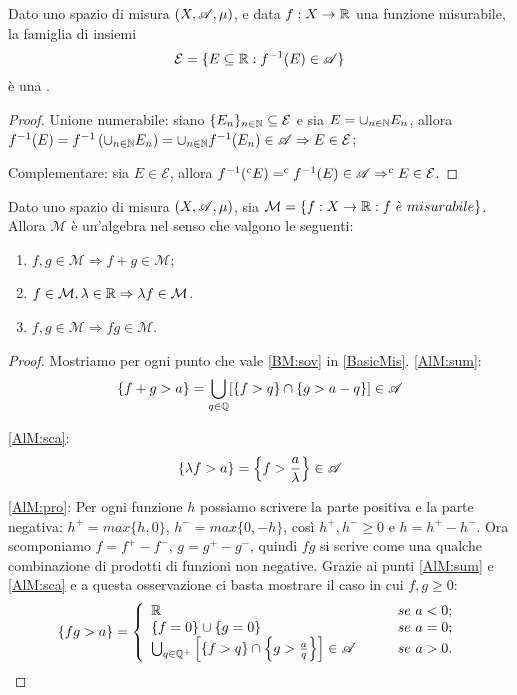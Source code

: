 \begin{proposition}
	\label{CounterImgMis}
	Dato uno spazio di misura $(X,\mathscr A,\mu)$, e data $f:X\rightarrow \mathbb R$ una funzione misurabile, la famiglia di insiemi
	\[
		\mathcal{E} = \{ E\subseteq \mathbb R : f^{-1}(E)\in \mathscr A \}
	\]
	è una \sigalg{}.
\end{proposition}
\begin{proof}
	Unione numerabile: siano $\{E_n\}_{n\in \mathbb N}\subseteq \mathcal{E}$ e sia $E = \cup_{n\in \mathbb N}E_n$,
	allora $f^{-1}(E)=f^{-1}\left(\cup_{n\in \mathbb N}E_n\right) = \cup_{n\in \mathbb N}f^{-1}(E_n)\in \mathscr A \Rightarrow E \in \mathcal{E}$;
	
	Complementare: sia $E\in \mathcal{E}$, allora $f^{-1}(^{c}E)= ^{c}f^{-1}(E)\in \mathscr A \Rightarrow ^{c}E \in \mathcal{E}$.
\end{proof}

\begin{proposition}
	Dato uno spazio di misura $(X,\mathscr A,\mu)$, sia $\mathcal{M}=\{f:X\rightarrow \R : f\ \grave{e} \ misurabile\}$.
	Allora $\mathcal{M}$ è un'algebra nel senso che valgono le seguenti:
	\begin{enumerate}[label=(\arabic*),ref=(\arabic*)]
		\item $f,g\in \mathcal{M} \Rightarrow f+g\in \mathcal{M}$; \label{AlM:sum}
		\item $f\in \mathcal{M}, \lambda \in \mathbb R \Rightarrow \lambda f\in \mathcal{M}$. \label{AlM:sca}
		\item $f,g\in \mathcal{M} \Rightarrow fg\in \mathcal{M}$. \label{AlM:pro}
	\end{enumerate}
\end{proposition}
\begin{proof}
	Mostriamo per ogni punto che vale \ref{BM:sov} in \cref{BasicMis}.
	\ref{AlM:sum}: 
	\[
		\{f+g>a\}=\bigcup_{q\in \mathbb Q}[\{f>q\}\cap\{g>a-q\}]\in \mathscr A
	\]

	
	\ref{AlM:sca}:
	\[
		\{\lambda f>a\}=\left\{f>\frac{a}{\lambda}\right\}\in \mathscr A
	\]

	\ref{AlM:pro}: Per ogni funzione $h$ possiamo scrivere la parte positiva e la parte negativa: $h^+ = max\{h,0\}$, $h^- = max\{0,-h\}$,
	così $h^+,h^- \geq 0$ e $h = h^+ - h^-$. Ora scomponiamo $f=f^+ - f^-$, $g=g^+- g^-$, quindi $fg$ si scrive
	come una qualche combinazione di prodotti di funzioni non negative. Grazie ai punti \ref{AlM:sum} e \ref{AlM:sca} e a questa osservazione
	ci basta mostrare il caso in cui $f,g\geq0$:
	\[
		\{fg>a\}=\left\{\begin{array}{ll}
			\mathbb R &\qquad se\ a<0;\\
			\{f=0\}\cup\{g=0\} &\qquad se\ a=0;\\
			\bigcup_{q\in \mathbb Q^+}\left[\{f>q\}\cap\left\{g>\frac{a}{q}\right\}\right]\in \mathscr A &\qquad se\ a>0.
		\end{array}\right.
	\]
\end{proof}

